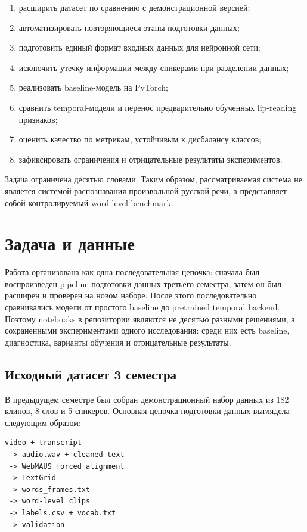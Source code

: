 \documentclass[12pt,a4paper]{article}
\begin{document}
\begin{enumerate}
\item расширить датасет по сравнению с демонстрационной версией;
\item автоматизировать повторяющиеся этапы подготовки данных;
\item подготовить единый формат входных данных для нейронной сети;
\item исключить утечку информации между спикерами при разделении данных;
\item реализовать baseline-модель на PyTorch;
\item сравнить temporal-модели и перенос предварительно обученных lip-reading
      признаков;
\item оценить качество по метрикам, устойчивым к дисбалансу классов;
\item зафиксировать ограничения и отрицательные результаты экспериментов.
\end{enumerate}

Задача ограничена десятью словами. Таким образом, рассматриваемая система
не является системой распознавания произвольной русской речи, а представляет
собой контролируемый word-level benchmark.

\section{Задача и данные}

Работа организована как одна последовательная цепочка: сначала был
воспроизведен pipeline подготовки данных третьего семестра, затем он был
расширен и проверен на новом наборе. После этого последовательно сравнивались
модели от простого baseline до pretrained temporal backend. Поэтому notebooks
в репозитории являются не десятью разными решениями, а сохраненными
экспериментами одного исследования: среди них есть baseline, диагностика,
варианты обучения и отрицательные результаты.

\subsection{Исходный датасет 3 семестра}

В предыдущем семестре был собран демонстрационный набор данных из 182 клипов,
8 слов и 5 спикеров. Основная цепочка подготовки данных выглядела следующим
образом:

\begin{center}
\begin{verbatim}
video + transcript
 -> audio.wav + cleaned text
 -> WebMAUS forced alignment
 -> TextGrid
 -> words_frames.txt
 -> word-level clips
 -> labels.csv + vocab.txt
 -> validation
\end{verbatim}
\end{center}
\end{document}
